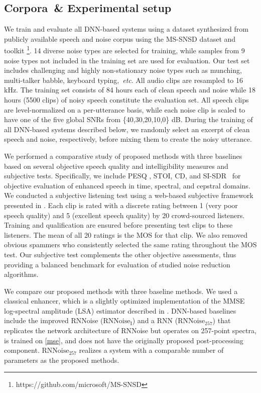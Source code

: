 \documentclass{article}
\begin{document}
\subsection{Corpora~\& Experimental setup}
We train and evaluate all DNN-based systems using a dataset synthesized from publicly available speech and noise corpus using the MS-SNSD dataset \cite{Reddy2019} and toolkit \footnote{https://github.com/microsoft/MS-SNSD}. 14 diverse noise types are selected for training, while samples from 9 noise types not included in the training set are used for evaluation. Our test set includes challenging and highly non-stationary noise types such as munching, multi-talker babble, keyboard typing,~\emph{etc}. All audio clips are resampled to 16 kHz. The training set consists of 84 hours each of clean speech and noise while 18 hours (5500 clips) of noisy speech constitute the evaluation set. All speech clips are level-normalized on a per-utterance basis, while each noise clip is scaled to have one of the five global SNRs from \{40,30,20,10,0\} dB. During the training of all DNN-based systems described below, we randomly select an excerpt of clean speech and noise, respectively, before mixing them to create the noisy utterance. 


We performed a comparative study of proposed methods with three baselines based on several objective speech quality and intelligibility measures and subjective tests. Specifically, we include \ac{PESQ} \cite{rix2001perceptual}, \ac{STOI}\cite{taal2010short}, \ac{CD}, and \ac{SI-SDR}~\cite{le2019sdr} for objective evaluation of enhanced speech in time, spectral, and cepstral domains. We conducted a subjective listening test using a web-based subjective framework presented in \cite{Reddy2019}. Each clip is rated with a discrete rating between 1 (very poor speech quality) and 5 (excellent speech quality) by 20 crowd-sourced listeners. Training and qualification are ensured before presenting test clips to these listeners. The mean of all 20 ratings is the \ac{MOS} for that clip. We also removed obvious spammers who consistently selected the same rating throughout the MOS test. Our subjective test complements the other objective assessments, thus providing a balanced benchmark for evaluation of studied noise reduction algorithms.


We compare our proposed methods with three baseline methods. We used a classical enhancer, which is a slightly optimized implementation of the MMSE log-spectral amplitude (LSA) estimator \cite{ephraim1985speech} described in \cite{tashev2009sound}. DNN-based baselines include the improved RNNoise ($\text{RNNoise}_\text{I}$) \cite{Reddy2019} and a RNN ($\text{RNNoise}_{257}$) that replicates the network architecture of RNNoise \cite{valin2018hybrid} but operates on 257-point spectra, is trained on \eqref{mse}, and does not have the originally proposed post-processing component. $\text{RNNoise}_{257}$ realizes a system with a comparable number of parameters as the proposed methods. 
\end{document}
